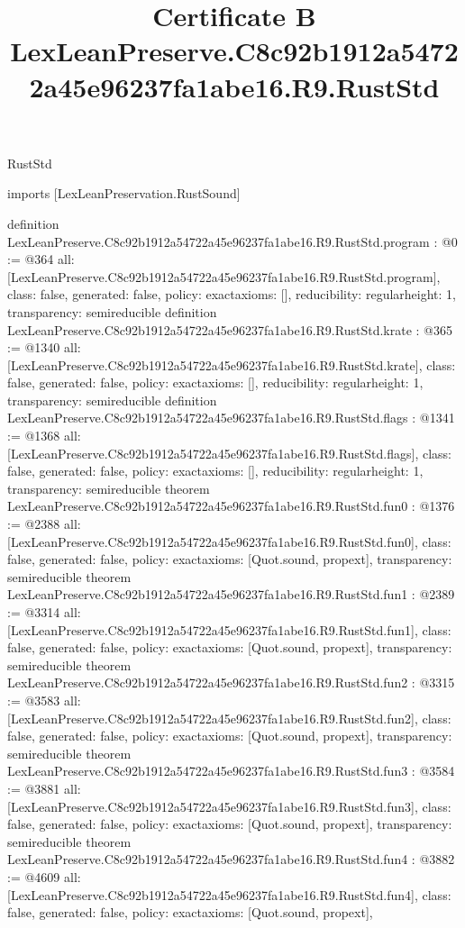 \begin{lexlean}{RustStd}
\title{Certificate B LexLeanPreserve.C8c92b1912a54722a45e96237fa1abe16.R9.RustStd}
\begin{coremodule}
imports [LexLeanPreservation.RustSound]

definition LexLeanPreserve.C8c92b1912a54722a45e96237fa1abe16.R9.RustStd.program : @0 := @364 {
  all: [LexLeanPreserve.C8c92b1912a54722a45e96237fa1abe16.R9.RustStd.program],
  class: false,
  generated: false,
  policy: exact{axioms: []},
  reducibility: regular{height: 1},
  transparency: semireducible
}
definition LexLeanPreserve.C8c92b1912a54722a45e96237fa1abe16.R9.RustStd.krate : @365 := @1340 {
  all: [LexLeanPreserve.C8c92b1912a54722a45e96237fa1abe16.R9.RustStd.krate],
  class: false,
  generated: false,
  policy: exact{axioms: []},
  reducibility: regular{height: 1},
  transparency: semireducible
}
definition LexLeanPreserve.C8c92b1912a54722a45e96237fa1abe16.R9.RustStd.flags : @1341 := @1368 {
  all: [LexLeanPreserve.C8c92b1912a54722a45e96237fa1abe16.R9.RustStd.flags],
  class: false,
  generated: false,
  policy: exact{axioms: []},
  reducibility: regular{height: 1},
  transparency: semireducible
}
theorem LexLeanPreserve.C8c92b1912a54722a45e96237fa1abe16.R9.RustStd.fun0 : @1376 := @2388 {
  all: [LexLeanPreserve.C8c92b1912a54722a45e96237fa1abe16.R9.RustStd.fun0],
  class: false,
  generated: false,
  policy: exact{axioms: [Quot.sound, propext]},
  transparency: semireducible
}
theorem LexLeanPreserve.C8c92b1912a54722a45e96237fa1abe16.R9.RustStd.fun1 : @2389 := @3314 {
  all: [LexLeanPreserve.C8c92b1912a54722a45e96237fa1abe16.R9.RustStd.fun1],
  class: false,
  generated: false,
  policy: exact{axioms: [Quot.sound, propext]},
  transparency: semireducible
}
theorem LexLeanPreserve.C8c92b1912a54722a45e96237fa1abe16.R9.RustStd.fun2 : @3315 := @3583 {
  all: [LexLeanPreserve.C8c92b1912a54722a45e96237fa1abe16.R9.RustStd.fun2],
  class: false,
  generated: false,
  policy: exact{axioms: [Quot.sound, propext]},
  transparency: semireducible
}
theorem LexLeanPreserve.C8c92b1912a54722a45e96237fa1abe16.R9.RustStd.fun3 : @3584 := @3881 {
  all: [LexLeanPreserve.C8c92b1912a54722a45e96237fa1abe16.R9.RustStd.fun3],
  class: false,
  generated: false,
  policy: exact{axioms: [Quot.sound, propext]},
  transparency: semireducible
}
theorem LexLeanPreserve.C8c92b1912a54722a45e96237fa1abe16.R9.RustStd.fun4 : @3882 := @4609 {
  all: [LexLeanPreserve.C8c92b1912a54722a45e96237fa1abe16.R9.RustStd.fun4],
  class: false,
  generated: false,
  policy: exact{axioms: [Quot.sound, propext]},
}
\end{coremodule}
\end{lexlean}

